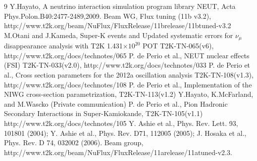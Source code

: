 \begin{thebibliography}{9}
%
%
  Y.Hayato, A neutrino interaction simulation program library NEUT,
  Acta Phys.Polon.B40:2477-2489,2009.
   Beam WG, Flux tuning (11b v3.2), http://www.t2k.org/beam/NuFlux/FluxRelease/11brelease/11btuned-v3.2
   M.Otani and J.Kameda,
   Super-K events and Updated systematic errors for $\nu_\mu$ disappearance analysis with T2K 1.431$\times10^{20}$ POT
   T2K-TN-065(v6),
   http://www.t2k.org/docs/technotes/065
  P. de Perio et al.,
  NEUT nuclear effects (FSI)
  T2K-TN-033(v2.0),
  http://www.t2k.org/docs/technotes/033
  P. de Perio et al.,
  Cross section parameters for the 2012a oscillation analysis
  T2K-TN-108(v1.3),
  http://www.t2k.org/docs/technotes/108
  P. de Perio et al.,
  Implementation of the NIWG cross-section parametrization,
  T2K-TN-113(v1.2) 
  Y.Hayato, K.McFarland, and M.Wascko (Private communication) 
  P. de Perio et al.,
  Pion Hadronic Secondary Interactions in Super-Kamiokande,
  T2K-TN-105(v1.1)
  http://www.t2k.org/docs/technotes/105
  Y. Ashie et al., Phys. Rev. Lett. 93, 101801 (2004);
  Y. Ashie et al., Phys. Rev. D71, 112005 (2005); 
  J. Hosaka et al., Phys. Rev. D 74, 032002 (2006).
  Beam group,
  http://www.t2k.org/beam/NuFlux/FluxRelease/11arelease/11atuned-v2.3.

%
%


\end{thebibliography}
